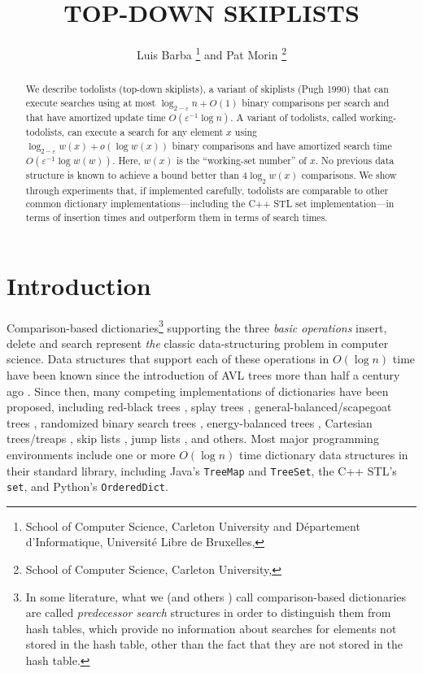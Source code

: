 \documentclass{patmorin}
\title{\MakeUppercase{Top-Down Skiplists}}
\author{Luis Barba%
     \thanks{School of Computer Science, Carleton University
             and Département d'Informatique, 
             Université Libre de Bruxelles,
             \email{lbarbafl@ulb.ac.be}}\enspace
     and Pat Morin%
     \thanks{School of Computer Science, Carleton University,
             \email{morin@scs.carleton.ca}}}
\newcommand{\eps}{\varepsilon}
\begin{document}
\begin{titlepage}
\maketitle

\begin{abstract}
  We describe todolists (top-down skiplists), a variant of skiplists
  (Pugh 1990) that can execute searches using at most $\log_{2-\eps}
  n + O(1)$ binary comparisons per search and that have amortized
  update time $O(\eps^{-1}\log n)$. A variant of todolists, called
  working-todolists, can execute a search for any element $x$ using
  $\log_{2-\eps} w(x) + o(\log w(x))$ binary comparisons and have
  amortized search time $O(\eps^{-1}\log w(w))$. Here, $w(x)$ is the
  ``working-set number'' of $x$. No previous data structure is known to
  achieve a bound better than $4\log_2 w(x)$ comparisons. We show through
  experiments that, if implemented carefully, todolists are comparable
  to other common dictionary implementations---including the C++ STL
  set implementation---in terms of insertion times and outperform them
  in terms of search times.
\end{abstract}

\end{titlepage}

\section{Introduction}

Comparison-based dictionaries\footnote{In some literature, what we (and
others \cite{badoiu.cole.ea:unified,bender.duan.ea:locality-preserving,bronnimann.cazals.ea:randomized,goodrich:competitive}) call comparison-based dictionaries are called \emph{predecessor
search} structures in order to distinguish them from hash tables, which
provide no information about searches for elements not stored in the hash
table, other than the fact that they are not stored in the hash table.}
supporting the three \emph{basic operations} insert, delete and search
represent \emph{the} classic data-structuring problem in computer science.
Data structures that support each of these operations in $O(\log n)$
time have been known since the introduction of AVL trees more than half
a century ago \cite{adelson-velskii.landis:algorithm}.  Since then,
many competing implementations of dictionaries have been proposed,
including red-black trees \cite{guibas.sedgewick:dichromatic}, splay
trees \cite{sleator.tarjan:self-adjusting}, general-balanced/scapegoat
trees \cite{andersson:general,galperin.rivest:scapegoat}, randomized
binary search trees \cite{martinez:randomized}, energy-balanced
trees \cite{goodrich:competitive}, Cartesian trees/treaps
\cite{aragon.seidel:randomized,vuillemin:unifying}, skip lists
\cite{pugh:skip}, jump lists \cite{bronnimann.cazals.ea:randomized},
and others.  Most major programming environments include one or more
$O(\log n)$ time dictionary data structures in their standard library,
including Java's \texttt{TreeMap} and \texttt{TreeSet}, the C++ STL's
\texttt{set}, and Python's \texttt{OrderedDict}.
\end{document}
